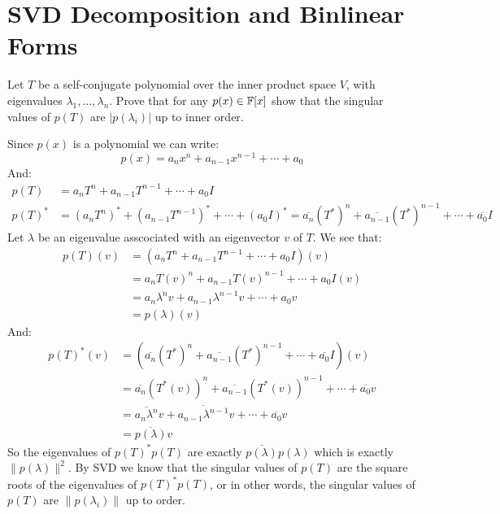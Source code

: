 \documentclass[11pt, a4paper]{article}
\begin{document}
\newpage
\section{SVD Decomposition and Binlinear Forms}

\begin{exercise}
  Let $T$ be a self-conjugate polynomial over the inner product space $V$, 
  with eigenvalues $\lambda_1,\dots,\lambda_n$.
  Prove that for any $p(x)\in\mathbb{F}[x]$ show that the singular values of $p(T)$ 
  are $\vert p(\lambda_i)\vert$ up to inner order.
\end{exercise}
\begin{solution}
  Since $p(x)$ is a polynomial we can write:
  \[
    p(x) = a_nx^n+a_{n-1}x^{n-1}+\cdots+a_0
  \]
  And:
  \begin{align*}
    p(T) &= a_nT^n+a_{n-1}T^{n-1}+\cdots+a_0I \\
    p(T)^* &= (a_nT^n)^* + (a_{n-1}T^{n-1})^* + \cdots + (a_0I)^* = 
    \overline{a_n}(T^*)^n + \overline{a_{n-1}}(T^*)^{n-1} + \cdots + 
    \overline{a_0}I
  \end{align*}
  Let $\lambda$ be an eigenvalue asscociated with an eigenvector $v$ of $T$. 
  We see that:
  \begin{align*}
    p(T)(v) &= (a_nT^n+a_{n-1}T^{n-1}+\cdots+a_0I)(v) \\ &= 
    a_nT(v)^n + a_{n-1}T(v)^{n-1} + \cdots + a_0I(v) \\ &= 
    a_n\lambda^{n}v + a_{n-1}\lambda^{n-1}v + \cdots + a_0v \\ &= 
    p(\lambda)(v)
  \end{align*}
  And:
  \begin{align*}
    p(T)^*(v) &= 
    (\overline{a_n}(T^*)^n + \overline{a_{n-1}}(T^*)^{n-1} + \cdots + 
    \overline{a_0}I)(v) \\ &=
    \overline{a_n}(T^*(v))^n + \overline{a_{n-1}}(T^*(v))^{n-1} + \cdots + 
    \overline{a_0}v\\ &=
    \overline{a_n\lambda^n}v + \overline{a_{n-1}\lambda^{n-1}}v + \cdots + 
    \overline{a_0}v\\ &=
    \overline{p(\lambda)}v
  \end{align*}
  So the eigenvalues of $p(T)^*p(T)$ are exactly 
  $\overline{p(\lambda)}p(\lambda)$ which is exactly $\|p(\lambda)\|^2$.
  By SVD we know that the singular values of $p(T)$ are the square roots
  of the eigenvalues of $p(T)^*p(T)$, or in other words, the singular values
  of $p(T)$ are $\|p(\lambda_i)\|$ up to order.
\end{solution}
\end{document}
